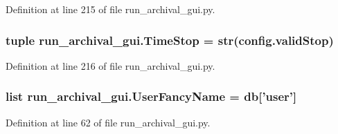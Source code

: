 Definition at line 215 of file run\-\_\-archival\-\_\-gui.\-py.

\hypertarget{namespacerun__archival__gui_a010097e05cebeb13d608b126cfa3c7a8}{
\subsubsection[{Time\-Stop}]{\setlength{\rightskip}{0pt plus 5cm}tuple run\-\_\-archival\-\_\-gui.\-Time\-Stop = str(config.\-valid\-Stop)}}\label{namespacerun__archival__gui_a010097e05cebeb13d608b126cfa3c7a8}


Definition at line 216 of file run\-\_\-archival\-\_\-gui.\-py.

\hypertarget{namespacerun__archival__gui_aefe12f3665230898e8f53887190a2c43}{
\subsubsection[{User\-Fancy\-Name}]{\setlength{\rightskip}{0pt plus 5cm}list run\-\_\-archival\-\_\-gui.\-User\-Fancy\-Name = {\bf db}\mbox{[}'user'\mbox{]}}}\label{namespacerun__archival__gui_aefe12f3665230898e8f53887190a2c43}


Definition at line 62 of file run\-\_\-archival\-\_\-gui.\-py.

